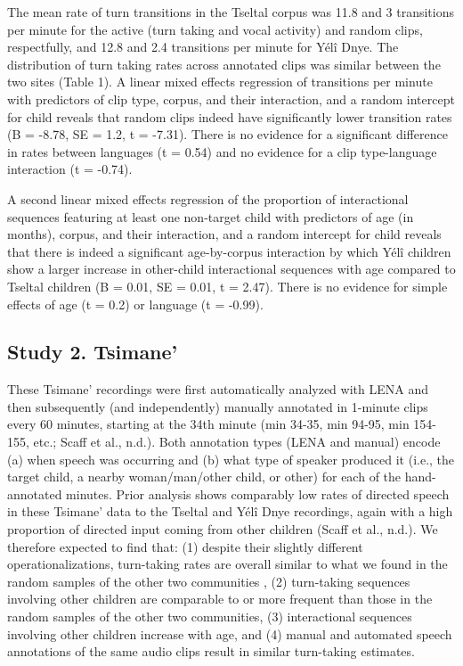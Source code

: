 \documentclass[10pt, letterpaper]{article}
\begin{document}
The mean rate of turn transitions in the Tseltal corpus was 11.8 and 3
transitions per minute for the active (turn taking and vocal activity)
and random clips, respectfully, and 12.8 and 2.4 transitions per minute
for Yélî Dnye. The distribution of turn taking rates across annotated
clips was similar between the two sites (Table 1). A linear mixed
effects regression of transitions per minute with predictors of clip
type, corpus, and their interaction, and a random intercept for child
reveals that random clips indeed have significantly lower transition
rates (B = -8.78, SE = 1.2, t = -7.31). There is no evidence for a
significant difference in rates between languages (t = 0.54) and no
evidence for a clip type-language interaction (t = -0.74).

A second linear mixed effects regression of the proportion of
interactional sequences featuring at least one non-target child with
predictors of age (in months), corpus, and their interaction, and a
random intercept for child reveals that there is indeed a significant
age-by-corpus interaction by which Yélî children show a larger increase
in other-child interactional sequences with age compared to Tseltal
children (B = 0.01, SE = 0.01, t = 2.47). There is no evidence for
simple effects of age (t = 0.2) or language (t = -0.99).

\hypertarget{study-2.-tsimane}{%
\subsection{Study 2. Tsimane'}\label{study-2.-tsimane}}

These Tsimane' recordings were first automatically analyzed with LENA
and then subsequently (and independently) manually annotated in 1-minute
clips every 60 minutes, starting at the 34th minute (min 34-35, min
94-95, min 154-155, etc.; Scaff et al., n.d.). Both annotation types
(LENA and manual) encode (a) when speech was occurring and (b) what type
of speaker produced it (i.e., the target child, a nearby woman/man/other
child, or other) for each of the hand-annotated minutes. Prior analysis
shows comparably low rates of directed speech in these Tsimane' data to
the Tseltal and Yélî Dnye recordings, again with a high proportion of
directed input coming from other children (Scaff et al., n.d.). We
therefore expected to find that: (1) despite their slightly different
operationalizations, turn-taking rates are overall similar to what we
found in the random samples of the other two communities , (2)
turn-taking sequences involving other children are comparable to or more
frequent than those in the random samples of the other two communities,
(3) interactional sequences involving other children increase with age,
and (4) manual and automated speech annotations of the same audio clips
result in similar turn-taking estimates.
\end{document}
